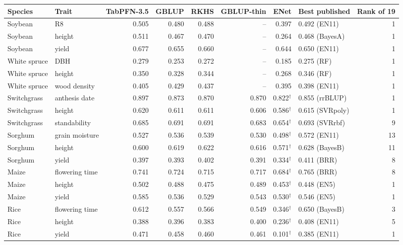 \begin{tabular}{llrrrrrlr}
\toprule
Species & Trait & TabPFN-3.5 & GBLUP & RKHS & GBLUP-thin & ENet & Best published & Rank of 19 \\
\midrule
Soybean & R8 & 0.505 & 0.480 & 0.488 & -- & 0.397 & 0.492 (EN11) & 1 \\
Soybean & height & 0.511 & 0.467 & 0.470 & -- & 0.264 & 0.468 (BayesA) & 1 \\
Soybean & yield & 0.677 & 0.655 & 0.660 & -- & 0.644 & 0.650 (EN11) & 1 \\
White spruce & DBH & 0.279 & 0.253 & 0.272 & -- & 0.185 & 0.275 (RF) & 1 \\
White spruce & height & 0.350 & 0.328 & 0.344 & -- & 0.268 & 0.346 (RF) & 1 \\
White spruce & wood density & 0.405 & 0.429 & 0.437 & -- & 0.395 & 0.398 (EN11) & 1 \\
Switchgrass & anthesis date & 0.897 & 0.873 & 0.870 & 0.870 & 0.822$^\dagger$ & 0.855 (rrBLUP) & 1 \\
Switchgrass & height & 0.620 & 0.611 & 0.611 & 0.606 & 0.586$^\dagger$ & 0.615 (SVRpoly) & 1 \\
Switchgrass & standability & 0.685 & 0.691 & 0.691 & 0.683 & 0.654$^\dagger$ & 0.693 (SVRrbf) & 9 \\
Sorghum & grain moisture & 0.527 & 0.536 & 0.539 & 0.530 & 0.498$^\dagger$ & 0.572 (EN11) & 13 \\
Sorghum & height & 0.600 & 0.619 & 0.622 & 0.616 & 0.571$^\dagger$ & 0.628 (BayesB) & 11 \\
Sorghum & yield & 0.397 & 0.393 & 0.402 & 0.391 & 0.334$^\dagger$ & 0.411 (BRR) & 8 \\
Maize & flowering time & 0.741 & 0.724 & 0.715 & 0.717 & 0.684$^\dagger$ & 0.765 (BRR) & 8 \\
Maize & height & 0.502 & 0.488 & 0.475 & 0.489 & 0.453$^\dagger$ & 0.448 (EN5) & 1 \\
Maize & yield & 0.585 & 0.536 & 0.529 & 0.543 & 0.530$^\dagger$ & 0.546 (EN5) & 1 \\
Rice & flowering time & 0.612 & 0.557 & 0.566 & 0.549 & 0.346$^\dagger$ & 0.650 (BayesB) & 3 \\
Rice & height & 0.388 & 0.396 & 0.383 & 0.400 & 0.236$^\dagger$ & 0.408 (EN11) & 5 \\
Rice & yield & 0.471 & 0.458 & 0.460 & 0.461 & 0.101$^\dagger$ & 0.385 (EN11) & 1 \\
\bottomrule
\end{tabular}
